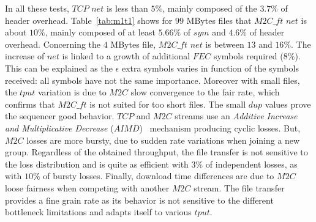\documentclass[a4paper]{article}
\begin{document}
        In all these tests, $TCP$ $net$ is less than $5\%$, mainly composed of
        the $3.7\%$ of header overhead.
Table~\ref{tab:m1t1} shows for $99$ MBytes files that $M2C\_ft$ $net$ is
        about $10\%$, mainly composed of at least $5.66\%$ of $sym$ and $4.6\%$
        of header overhead.  Concerning the $4$ MBytes file, $M2C\_ft$ $net$ is
        between $13$ and $16\%$.  The increase of $net$ is linked to a
        growth of additional $FEC$ symbols required ($8\%$). This can be
        explained as the $\epsilon$ extra symbols varies in function of the
        symbols received: all symbols have not the same importance.  Moreover
        with small files, the $tput$ variation is due to $M2C$ slow
        convergence to the fair rate, which confirms that $M2C\_ft$ is not
        suited for too short files.
The small $dup$ values prove the sequencer good behavior.
$TCP$ and $M2C$ streams use an \textit{Additive Increase and
            Multiplicative Decrease} ($AIMD$)~\cite{yang_general_2000} mechanism
            producing cyclic losses.  But, $M2C$ losses are more bursty, due to
            sudden rate variations when joining a new group.  Regardless of the
            obtained throughput, the file transfer is not sensitive to the loss
            distribution and is quite as efficient with $3\%$ of independent
            losses, as with $10\%$ of bursty losses.  Finally, download time
            differences are due to $M2C$ loose fairness when competing with
            another $M2C$ stream.
The file transfer provides a fine grain rate as its behavior is not
        sensitive to the different bottleneck limitations and adapts itself to
        various $tput$.
\end{document}
